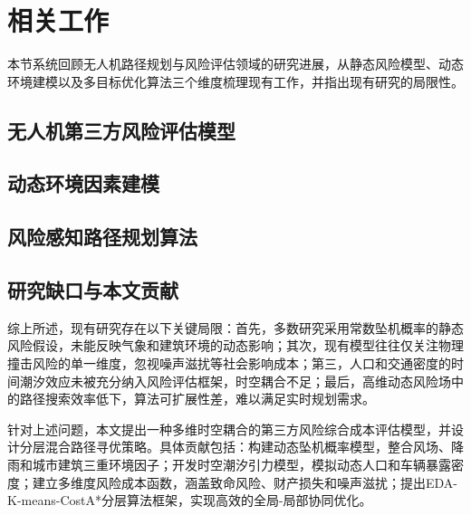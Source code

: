 
\section{相关工作}
\label{sec:related_work}

本节系统回顾无人机路径规划与风险评估领域的研究进展，从静态风险模型、动态环境建模以及多目标优化算法三个维度梳理现有工作，并指出现有研究的局限性。

\subsection{无人机第三方风险评估模型}


\subsection{动态环境因素建模}



\subsection{风险感知路径规划算法}


\subsection{研究缺口与本文贡献}

综上所述，现有研究存在以下关键局限：首先，多数研究采用常数坠机概率的静态风险假设，未能反映气象和建筑环境的动态影响；其次，现有模型往往仅关注物理撞击风险的单一维度，忽视噪声滋扰等社会影响成本；第三，人口和交通密度的时间潮汐效应未被充分纳入风险评估框架，时空耦合不足；最后，高维动态风险场中的路径搜索效率低下，算法可扩展性差，难以满足实时规划需求。

针对上述问题，本文提出一种多维时空耦合的第三方风险综合成本评估模型，并设计分层混合路径寻优策略。具体贡献包括：构建动态坠机概率模型，整合风场、降雨和城市建筑三重环境因子；开发时空潮汐引力模型，模拟动态人口和车辆暴露密度；建立多维度风险成本函数，涵盖致命风险、财产损失和噪声滋扰；提出EDA-K-means-CostA*分层算法框架，实现高效的全局-局部协同优化。
